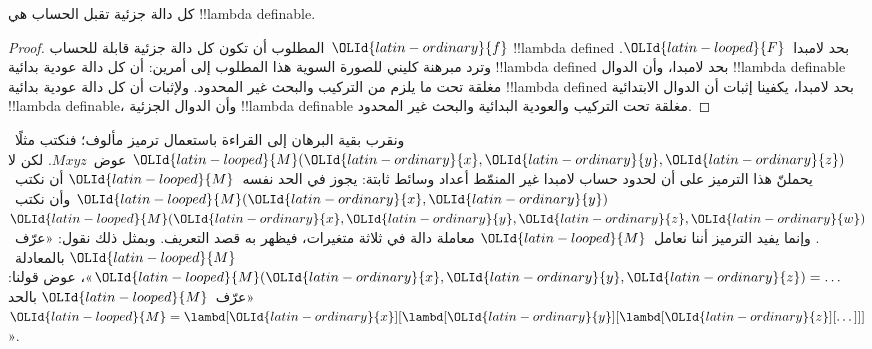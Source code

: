 \documentclass[../../../include/open-logic-section]{subfiles}
\begin{document}

\begin{thm}
كل دالة جزئية تقبل الحساب هي !!{lambda definable}.
\end{thm}

\begin{proof}
المطلوب أن تكون كل دالة جزئية قابلة للحساب~${\OLId{latin-ordinary}{f}}$
!!{lambda defined} بحد لامبدا~${\OLId{latin-looped}{F}}$.
وترد مبرهنة كليني للصورة السوية هذا المطلوب إلى أمرين:
أن كل دالة عودية بدائية !!{lambda defined} بحد لامبدا،
وأن الدوال !!{lambda definable} مغلقة تحت ما يلزم من
التركيب والبحث غير المحدود.
ولإثبات أن كل دالة عودية بدائية !!{lambda defined} بحد لامبدا،
يكفينا إثبات أن الدوال الابتدائية !!{lambda definable}،
وأن الدوال الجزئية !!{lambda definable} مغلقة تحت التركيب
والعودية البدائية والبحث غير المحدود.
\end{proof}

ونقرب بقية البرهان إلى القراءة باستعمال ترميز مألوف؛
فنكتب مثلًا~${\OLId{latin-looped}{M}}({\OLId{latin-ordinary}{x}}, {\OLId{latin-ordinary}{y}}, {\OLId{latin-ordinary}{z}})$ عوض~$Mxyz$.
لكن لا يحملنّ هذا الترميز على أن لحدود حساب لامبدا غير
المنمّط أعداد وسائط ثابتة: يجوز في الحد نفسه~${\OLId{latin-looped}{M}}$
أن نكتب~${\OLId{latin-looped}{M}}({\OLId{latin-ordinary}{x}},{\OLId{latin-ordinary}{y}})$ وأن نكتب~${\OLId{latin-looped}{M}}({\OLId{latin-ordinary}{x}},{\OLId{latin-ordinary}{y}},{\OLId{latin-ordinary}{z}},{\OLId{latin-ordinary}{w}})$.
وإنما يفيد الترميز أننا نعامل~${\OLId{latin-looped}{M}}$ معاملة دالة في ثلاثة
متغيرات، فيظهر به قصد التعريف.
وبمثل ذلك نقول: «عرّف~${\OLId{latin-looped}{M}}$ بالمعادلة~${\OLId{latin-looped}{M}}({\OLId{latin-ordinary}{x}},{\OLId{latin-ordinary}{y}},{\OLId{latin-ordinary}{z}}) = \dots$»،
عوض قولنا: «عرّف~${\OLId{latin-looped}{M}}$ بالحد~${\OLId{latin-looped}{M}} = \lambd[{\OLId{latin-ordinary}{x}}][\lambd[{\OLId{latin-ordinary}{y}}][\lambd[{\OLId{latin-ordinary}{z}}][\dots]]]$».
\end{document}
